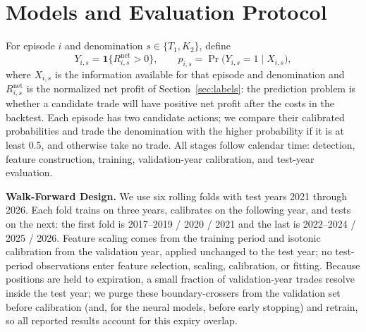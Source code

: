 \documentclass[sigconf]{acmart}
\begin{document}
\section{Models and Evaluation Protocol}
\label{sec:method}

For episode $i$ and denomination $s\in\{T_1,K_2\}$, define
\[
Y_{i,s}=\mathbf 1\{R^{\mathrm{net}}_{i,s}>0\},
\qquad
p_{i,s}=
\Pr\big(Y_{i,s}=1\mid X_{i,s}\big),
\]
where $X_{i,s}$ is the information available for that episode and denomination and $R^{\mathrm{net}}_{i,s}$ is the normalized net profit of Section~\ref{sec:labels}: the prediction problem is whether a candidate trade will have positive net profit after the costs in the backtest. Each episode has two candidate actions; we compare their calibrated probabilities and trade the denomination with the higher probability if it is at least 0.5, and otherwise take no trade. All stages follow calendar time: detection, feature construction, training, validation-year calibration, and test-year evaluation.

\smallskip\noindent\textbf{Walk-Forward Design.}
We use six rolling folds with test years 2021 through 2026. Each fold trains on three years, calibrates on the following year, and tests on the next: the first fold is 2017--2019 / 2020 / 2021 and the last is 2022--2024 / 2025 / 2026. Feature scaling comes from the training period and isotonic calibration from the validation year, applied unchanged to the test year; no test-period observations enter feature selection, scaling, calibration, or fitting. Because positions are held to expiration, a small fraction of validation-year trades resolve inside the test year; we purge these boundary-crossers from the validation set before calibration (and, for the neural models, before early stopping) and retrain, so all reported results account for this expiry overlap.
\end{document}
